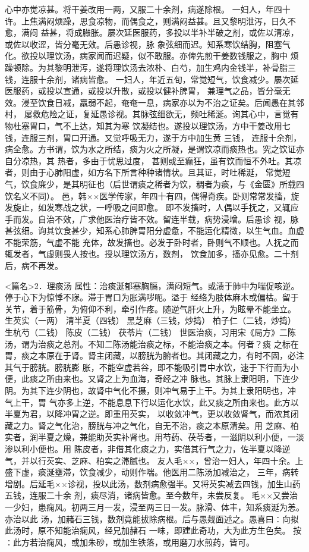 \documentclass[a4paper,12pt,UTF8,twoside]{ctexbook}
\begin{document}
心中亦觉凉甚。将干姜改用一两，又服二十余剂，病遂除根。 
一妇人，年四十许。上焦满闷烦躁，思食凉物，而偶食之，则满闷益甚。且又黎明泄泻，日久不愈，满闷 
益甚，将成臌胀。屡次延医服药，多投以半补半破之剂，或佐以清凉，或佐以收涩，皆分毫无效。后愚诊视，脉 
象弦细而迟。知系寒饮结胸，阻塞气化。欲投以理饮汤，病家闻而迟疑，似不敢服。亦俾先煎干姜数钱服之，胸中 
烦躁顿除。为其黎明泄泻，遂将理饮汤去浓朴、白芍，加生鸡内金钱半，补骨脂三钱，连服十余剂，诸病皆愈。 
一妇人，年近五旬，常觉短气，饮食减少。屡次延医服药，或投以宣通，或投以升散，或投以健补脾胃， 
兼理气之品，皆分毫无效。浸至饮食日减，羸弱不起，奄奄一息，病家亦以为不治之证矣。后闻愚在其邻村， 
屡救危险之证，复延愚诊视。其脉弦细欲无，频吐稀涎。询其心中，言觉有物杜塞胃口，气不上达，知其为寒 
饮凝结也。遂投以理饮汤，方中干姜改用七钱，连服三剂，胃口开通。又觉呼吸无力，遂于方中加生黄 三钱， 
连服十余剂，病全愈。方书谓，饮为水之所结，痰为火之所凝，是谓饮凉而痰热也。究之饮证亦自分凉热，其 
热者，多由于忧思过度， 
甚则或至癫狂，虽有饮而恒不外吐。其凉者，则由于心肺阳虚，如方名下所言种种诸情状。且其证，时吐稀涎， 
常觉短气，饮食廉少，是其明征也（后世谓痰之稀者为饮，稠者为痰，与《金匮》所载四饮名义不同）。 
邑，韩××医学传家，年四十有四，偶得奇疾。卧则常常发搐，旋发旋止，如发寒战之状，一呼吸之间即愈。 
即不发搐时，人偶以手抚之，又辄应手而发。自治不效，广求他医治疗皆不效。留连半载，病势浸增。后愚诊 
视，脉甚弦细。询其饮食甚少，知系心肺脾胃阳分虚惫，不能运化精微，以生气血。血虚不能荣筋，气虚不能 
充体，故发搐也。必发于卧时者，卧则气不顺也。人抚之而辄发者，气虚则畏人按也。授以理饮汤方，数剂， 
饮食加多，搐亦见愈。二十剂后，病不再发。 


<篇名>2．理痰汤
属性：治痰涎郁塞胸膈，满闷短气。或渍于肺中为喘促咳逆。停于心下为惊悸不寐。滞于胃口为胀满哕呃。溢于 
经络为肢体麻木或偏枯。留于关节，着于筋骨，为俯仰不利，牵引作疼。随逆气肝火上升，为眩晕不能坐立。 
生芡实（一两） 清半夏（四钱） 黑芝麻（三钱，炒捣） 柏子仁（二钱，炒捣） 生杭芍（二钱） 
陈皮（二钱） 茯苓片（二钱） 
世医治痰，习用宋《局方》二陈汤，谓为治痰之总剂。不知二陈汤能治痰之标，不能治痰之本。何者？痰 
之标在胃，痰之本原在于肾。肾主闭藏，以膀胱为腑者也。其闭藏之力，有时不固，必注其气于膀胱。膀胱膨 
胀，不能空虚若谷，即不能吸引胃中水饮，速于下行而为小便，此痰之所由来也。又肾之上为血海，奇经之冲 
脉也。其脉上隶阳明，下连少阴。为其下连少阴也，故肾中气化不摄，则冲气易于上干。为其上隶阳明也，冲 
气上干，胃 
气亦多上逆，不能息息下行以运化水饮，此又痰之所由来也。此方以半夏为君，以降冲胃之逆。即重用芡实， 
以收敛冲气，更以收敛肾气，而浓其闭藏之力。肾之气化治，膀胱与冲之气化，自无不治，痰之本原清矣。用 
芝麻、柏实者，润半夏之燥，兼能助芡实补肾也。用芍药、茯苓者，一滋阴以利小便，一淡渗以利小便也。用 
陈皮者，非借其化痰之力，实借其行气之力，佐半夏以降逆气，并以行芡实、芝麻、柏实之滞腻也。 
友人毛××，曾治一妇人，年四十余。上盛下虚，痰涎壅滞，饮食减少，动则作喘。他医用二陈汤加减治之， 
三年，病转增剧。后延毛××诊视，投以此汤，数剂病愈强半。又将芡实减去四钱，加生山药五钱，连服二十余 
剂，痰尽消，诸病皆愈。至今数年，未尝反复。 
毛××又尝治一少妇，患痫风。初两三月一发，浸至两三日一发。脉滑、体丰，知系痰涎为恙。亦治以此 
汤，加赭石三钱，数剂竟能拔除病根。后与愚觌面述之。愚喜曰∶向拟此汤时，原不知能治痫风，经兄加赭石 
一味，即建此奇功，大为此方生色矣。 
按∶此方若治痫风，或加朱砂，或加生铁落，或用磨刀水煎药，皆可。 
\end{document}
